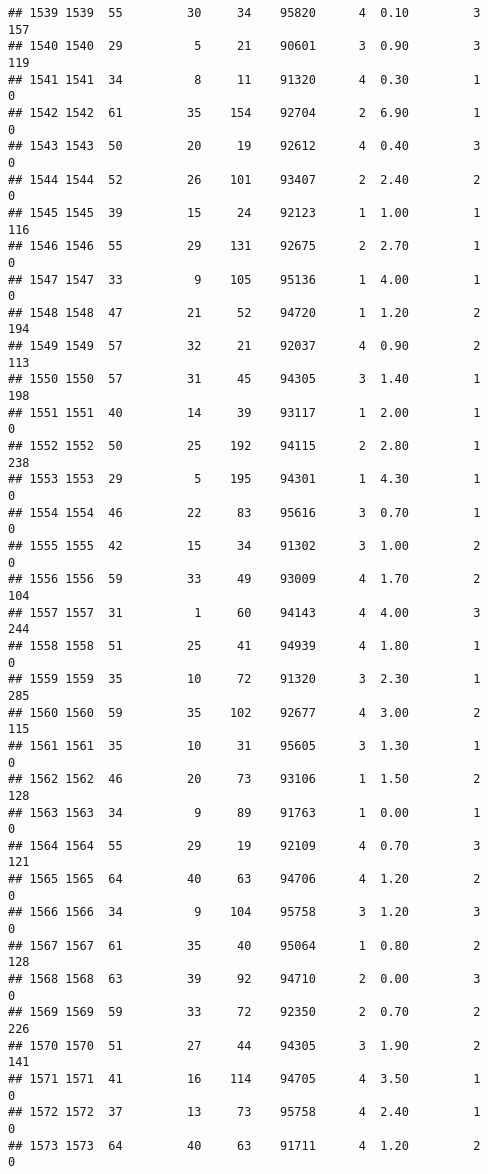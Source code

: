 \documentclass[
]{article}
\begin{document}
\begin{verbatim}
## 1539 1539  55         30     34    95820      4  0.10         3      157
## 1540 1540  29          5     21    90601      3  0.90         3      119
## 1541 1541  34          8     11    91320      4  0.30         1        0
## 1542 1542  61         35    154    92704      2  6.90         1        0
## 1543 1543  50         20     19    92612      4  0.40         3        0
## 1544 1544  52         26    101    93407      2  2.40         2        0
## 1545 1545  39         15     24    92123      1  1.00         1      116
## 1546 1546  55         29    131    92675      2  2.70         1        0
## 1547 1547  33          9    105    95136      1  4.00         1        0
## 1548 1548  47         21     52    94720      1  1.20         2      194
## 1549 1549  57         32     21    92037      4  0.90         2      113
## 1550 1550  57         31     45    94305      3  1.40         1      198
## 1551 1551  40         14     39    93117      1  2.00         1        0
## 1552 1552  50         25    192    94115      2  2.80         1      238
## 1553 1553  29          5    195    94301      1  4.30         1        0
## 1554 1554  46         22     83    95616      3  0.70         1        0
## 1555 1555  42         15     34    91302      3  1.00         2        0
## 1556 1556  59         33     49    93009      4  1.70         2      104
## 1557 1557  31          1     60    94143      4  4.00         3      244
## 1558 1558  51         25     41    94939      4  1.80         1        0
## 1559 1559  35         10     72    91320      3  2.30         1      285
## 1560 1560  59         35    102    92677      4  3.00         2      115
## 1561 1561  35         10     31    95605      3  1.30         1        0
## 1562 1562  46         20     73    93106      1  1.50         2      128
## 1563 1563  34          9     89    91763      1  0.00         1        0
## 1564 1564  55         29     19    92109      4  0.70         3      121
## 1565 1565  64         40     63    94706      4  1.20         2        0
## 1566 1566  34          9    104    95758      3  1.20         3        0
## 1567 1567  61         35     40    95064      1  0.80         2      128
## 1568 1568  63         39     92    94710      2  0.00         3        0
## 1569 1569  59         33     72    92350      2  0.70         2      226
## 1570 1570  51         27     44    94305      3  1.90         2      141
## 1571 1571  41         16    114    94705      4  3.50         1        0
## 1572 1572  37         13     73    95758      4  2.40         1        0
## 1573 1573  64         40     63    91711      4  1.20         2        0

\end{verbatim}
\end{document}
